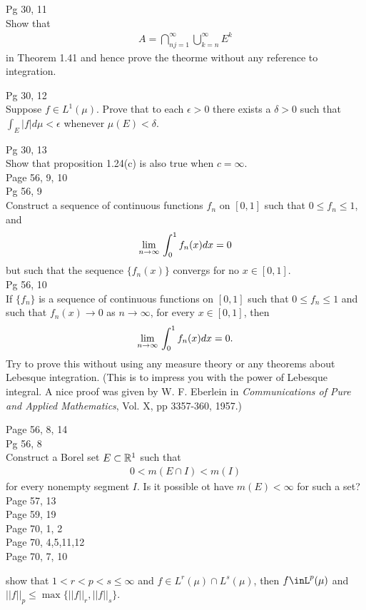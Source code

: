 \documentclass[10pt,a4paper]{report}
\begin{document}
\HLINE
\noindent Pg 30, 11\\

Show that 
\begin{align*}
	A = \bigcap_{nj=1}^\infty \bigcup_{k=n}^\infty E^k
\end{align*}in Theorem 1.41 and hence prove the theorme without any reference to integration.


\HLINE
\noindent Pg 30, 12\\

Suppose $f \in L^1(\mu)$.  Prove that to each $\epsilon > 0$ there exists a $\delta > 0$ such that $\int_E|f| d\mu < \epsilon$ whenever $\mu(E) < \delta$.


\HLINE
\noindent Pg 30, 13\\

Show that proposition 1.24(c) is also true when $c = \infty$.\\

Page 56, 9, 10\\
\HLINE
\noindent Pg 56, 9\\

Construct a sequence of continuous functions $f_n$ on $[0,1]$ such that $0 \le f_n\le 1$, and
\begin{align*}
	\underset{n \to \infty}\lim\, \int_0^1 f_n(x)dx = 0
\end{align*}but such that the sequence $\{f_n(x)\}$ convergs for no $x \in [0,1]$.\\

\HLINE
\noindent Pg 56, 10\\

If $\{f_n\}$ is a sequence of continuous functions on $[0,1]$ such that $0\le f_n\le 1$ and such that $f_n(x) \to 0$ as $n\to \infty$,  for every $x \in [0,1]$, then 
\begin{align*}
	\underset{n \to \infty}\lim\, \int_0^1 f_n(x) dx = 0.
\end{align*}Try to prove this without using any measure theory or any theorems about Lebesque integration.  (This is to impress you with the power of Lebesque integral.  A nice proof was given by W. F. Eberlein in \textit{Communications of Pure and Applied Mathematics}, Vol. X, pp 3357-360, 1957.)

\HLINE
Page 56, 8, 14\\

\noindent Pg 56, 8 \\

Construct a Borel set $E \subset \mathbb{R}^1$ such that 
\begin{align*}
	0 < m(E\cap I) < m(I)
\end{align*}for every nonempty segment $I$.  Is it possible ot have $m(E) < \infty$ for such a set?
Page 57, 13\\
Page 59, 19\\
Page 70, 1, 2\\
Page 70, 4,5,11,12\\
Page 70, 7, 10

\newpage
show that $1< r < p < s \le \infty$ and $f \in L^r(\mu) \cap L^s(\mu)$, then $f \inL^p(\mu)$ and $||f||_p \le \max\{||f||_r, ||f||_s\}$.
\end{document}
